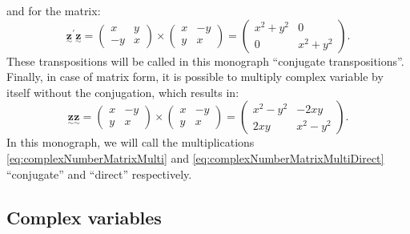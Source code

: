 \documentclass[
]{book}
\begin{document}
and for the matrix:
\begin{equation}
    \underset{\sim}{\boldsymbol{z}}^\prime \underset{\sim}{\boldsymbol{z}} = \begin{pmatrix} x & y \\ -y & x \end{pmatrix} \times \begin{pmatrix} x & -y \\ y & x \end{pmatrix} = 
    \begin{pmatrix} x^2 + y^2 & 0 \\ 0 & x^2 + y^2 \end{pmatrix}.
    \label{eq:complexNumberMatrixMulti}
\end{equation}
These transpositions will be called in this monograph ``conjugate transpositions''. Finally, in case of matrix form, it is possible to multiply complex variable by itself without the conjugation, which results in:
\begin{equation}
    \underset{\sim}{\boldsymbol{z}} \underset{\sim}{\boldsymbol{z}} = \begin{pmatrix} x & -y \\ y & x \end{pmatrix} \times \begin{pmatrix} x & -y \\ y & x \end{pmatrix} = 
    \begin{pmatrix} x^2 - y^2 & - 2 xy \\ 2 xy & x^2 - y^2 \end{pmatrix}.
    \label{eq:complexNumberMatrixMultiDirect}
\end{equation}
In this monograph, we will call the multiplications \eqref{eq:complexNumberMatrixMulti} and \eqref{eq:complexNumberMatrixMultiDirect} ``conjugate'' and ``direct'' respectively.

\hypertarget{complexVariable}{%
\subsection{Complex variables}\label{complexVariable}}
\end{document}
